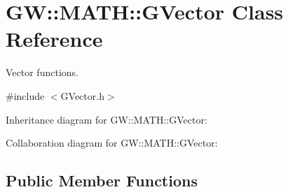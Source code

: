\hypertarget{classGW_1_1MATH_1_1GVector}{}\section{GW\+:\+:M\+A\+TH\+:\+:G\+Vector Class Reference}
\label{classGW_1_1MATH_1_1GVector}


Vector functions.  




{\ttfamily \#include $<$G\+Vector.\+h$>$}



Inheritance diagram for GW\+:\+:M\+A\+TH\+:\+:G\+Vector\+:


Collaboration diagram for GW\+:\+:M\+A\+TH\+:\+:G\+Vector\+:
\subsection*{Public Member Functions}

